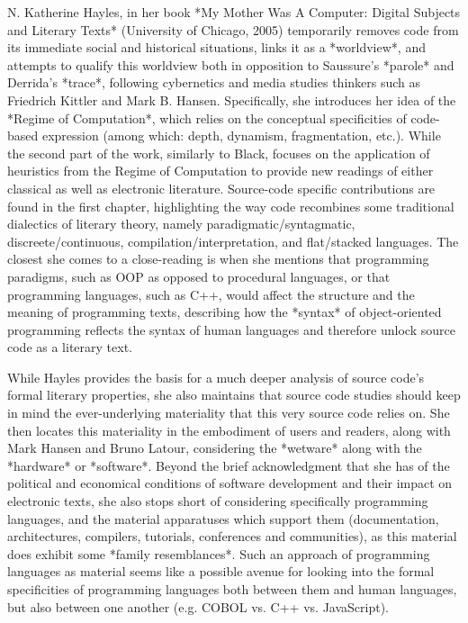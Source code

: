 N. Katherine Hayles, in her book *My Mother Was A Computer: Digital Subjects and Literary Texts* (University of Chicago, 2005) temporarily removes code from its immediate social and historical situations, links it as a *worldview*, and attempts to qualify this worldview both in opposition to Saussure's *parole* and Derrida's *trace*, following cybernetics and media studies thinkers such as Friedrich Kittler and Mark B. Hansen. Specifically, she introduces her idea of the *Regime of Computation*, which relies on the conceptual specificities of code-based expression (among which: depth, dynamism, fragmentation, etc.). While the second part of the work, similarly to Black, focuses on the application of heuristics from the Regime of Computation to provide new readings of either classical as well as electronic literature. Source-code specific contributions are found in the first chapter, highlighting the way code recombines some traditional dialectics of literary theory, namely paradigmatic/syntagmatic, discreete/continuous, compilation/interpretation, and flat/stacked languages. The closest she comes to a close-reading is when she mentions that programming paradigms, such as OOP as opposed to procedural languages, or that programming languages, such as C++, would affect the structure and the meaning of programming texts, describing how the *syntax* of object-oriented programming reflects the syntax of human languages and therefore unlock source code as a literary text.

While Hayles provides the basis for a much deeper analysis of source code's formal literary properties, she also maintains that source code studies should keep in mind the ever-underlying materiality that this very source code relies on. She then locates this materiality in the embodiment of users and readers, along with Mark Hansen and Bruno Latour, considering the *wetware* along with the *hardware* or *software*. Beyond the brief acknowledgment that she has of the political and economical conditions of software development and their impact on electronic texts, she also stops short of considering specifically programming languages, and the material apparatuses which support them (documentation, architectures, compilers, tutorials, conferences and communities), as this material does exhibit some *family resemblances*. Such an approach of programming languages as material seems like a possible avenue for looking into the formal specificities of programming languages both between them and human languages, but also between one another (e.g. COBOL vs. C++ vs. JavaScript).

